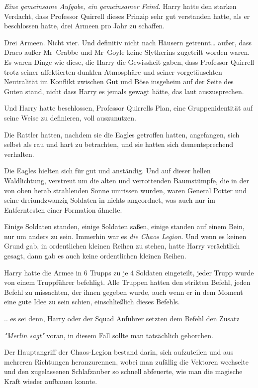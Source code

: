 {\emph{Eine gemeinsame Aufgabe, ein gemeinsamer Feind.} Harry hatte den starken Verdacht, dass Professor Quirrell dieses Prinzip sehr gut verstanden hatte, als er beschlossen hatte, drei Armeen pro Jahr zu schaffen.

Drei Armeen. Nicht vier. Und definitiv nicht nach Häusern getrennt… außer, dass Draco außer Mr~Crabbe und Mr~Goyle keine Slytherins zugeteilt worden waren. Es waren Dinge wie diese, die Harry die Gewissheit gaben, dass Professor Quirrell trotz seiner affektierten dunklen Atmosphäre und seiner vorgetäuschten Neutralität im Konflikt zwischen Gut und Böse insgeheim auf der Seite des Guten stand, nicht dass Harry es jemals gewagt hätte, das laut auszusprechen.

Und Harry hatte beschlossen, Professor Quirrells Plan, eine Gruppenidentität auf seine Weise zu definieren, voll auszunutzen.

Die Rattler hatten, nachdem sie die Eagles getroffen hatten, angefangen, sich selbst als rau und hart zu betrachten, und sie hatten sich dementsprechend verhalten.

Die Eagles hielten sich für gut und anständig. Und auf dieser hellen Waldlichtung, verstreut um die alten und verrottenden Baumstümpfe, die in der von oben herab strahlenden Sonne umrissen wurden, waren General Potter und seine dreiundzwanzig Soldaten in nichts angeordnet, was auch nur im Entferntesten einer Formation ähnelte.

Einige Soldaten standen, einige Soldaten saßen, einige standen auf einem Bein, nur um anders zu sein. Immerhin war es \emph{die Chaos Legion}. Und wenn es keinen Grund gab, in ordentlichen kleinen Reihen zu stehen, hatte Harry verächtlich gesagt, dann gab es auch keine ordentlichen kleinen Reihen.

Harry hatte die Armee in 6 Trupps zu je 4 Soldaten eingeteilt, jeder Trupp wurde von einem Truppführer befehligt. Alle Truppen hatten den strikten Befehl, jeden Befehl zu missachten, der ihnen gegeben wurde, auch wenn er in dem Moment eine gute Idee zu sein schien, einschließlich dieses Befehls.

.. es sei denn, Harry oder der Squad Anführer setzten dem Befehl den Zusatz

\emph{"Merlin sagt"} voran, in diesem Fall sollte man tatsächlich gehorchen.

Der Hauptangriff der Chaos-Legion bestand darin, sich aufzuteilen und aus mehreren Richtungen heranzurennen, wobei man zufällig die Vektoren wechselte und den zugelassenen Schlafzauber so schnell abfeuerte, wie man die magische Kraft wieder aufbauen konnte.

}
